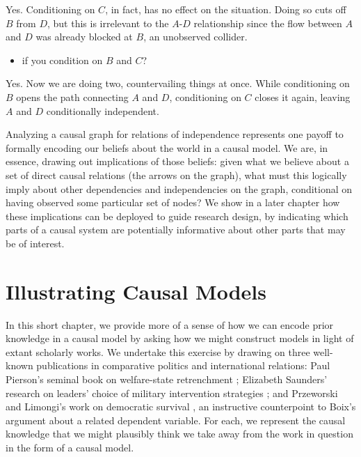 \documentclass[
  12pt,
]{book}
\providecommand{\tightlist}{%
  \setlength{\itemsep}{0pt}\setlength{\parskip}{0pt}}
\begin{document}
Yes. Conditioning on \(C\), in fact, has no effect on the situation. Doing so cuts off \(B\) from \(D\), but this is irrelevant to the \(A\)-\(D\) relationship since the flow between \(A\) and \(D\) was already blocked at \(B\), an unobserved collider.

\begin{itemize}
\tightlist
\item
  if you condition on \(B\) and \(C\)?
\end{itemize}

Yes. Now we are doing two, countervailing things at once. While conditioning on \(B\) opens the path connecting \(A\) and \(D\), conditioning on \(C\) closes it again, leaving \(A\) and \(D\) conditionally independent.

Analyzing a causal graph for relations of independence represents one payoff to formally encoding our beliefs about the world in a causal model. We are, in essence, drawing out implications of those beliefs: given what we believe about a set of direct causal relations (the arrows on the graph), what must this logically imply about other dependencies and independencies on the graph, conditional on having observed some particular set of nodes? We show in a later chapter how these implications can be deployed to guide research design, by indicating which parts of a causal system are potentially informative about other parts that may be of interest.

\hypertarget{illustratemodels}{%
\chapter{Illustrating Causal Models}\label{illustratemodels}}

In this short chapter, we provide more of a sense of how we can encode prior knowledge in a causal model by asking how we might construct models in light of extant scholarly works. We undertake this exercise by drawing on three well-known publications in comparative politics and international relations: Paul Pierson's seminal book on welfare-state retrenchment \citep{pierson1994dismantling}; Elizabeth Saunders' research on leaders' choice of military intervention strategies \citep{saunders2011leaders}; and Przeworski and Limongi's work on democratic survival \citep{przeworski1997modernization}, an instructive counterpoint to Boix's \citep{boix2003democracy} argument about a related dependent variable. For each, we represent the causal knowledge that we might plausibly think we take away from the work in question in the form of a causal model.
\end{document}
